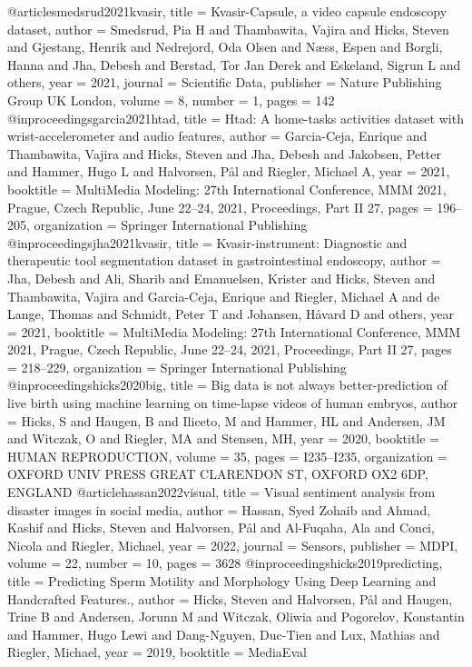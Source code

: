 @article{smedsrud2021kvasir,
	title = {Kvasir-Capsule, a video capsule endoscopy dataset},
	author = {Smedsrud, Pia H and Thambawita, Vajira and Hicks, Steven and Gjestang, Henrik and Nedrejord, Oda Olsen and N{\ae}ss, Espen and Borgli, Hanna and Jha, Debesh and Berstad, Tor Jan Derek and Eskeland, Sigrun L and others},
	year = 2021,
	journal = {Scientific Data},
	publisher = {Nature Publishing Group UK London},
	volume = 8,
	number = 1,
	pages = 142
}
@inproceedings{garcia2021htad,
	title = {Htad: A home-tasks activities dataset with wrist-accelerometer and audio features},
	author = {Garcia-Ceja, Enrique and Thambawita, Vajira and Hicks, Steven and Jha, Debesh and Jakobsen, Petter and Hammer, Hugo L and Halvorsen, P{\aa}l and Riegler, Michael A},
	year = 2021,
	booktitle = {MultiMedia Modeling: 27th International Conference, MMM 2021, Prague, Czech Republic, June 22--24, 2021, Proceedings, Part II 27},
	pages = {196--205},
	organization = {Springer International Publishing}
}
@inproceedings{jha2021kvasir,
	title = {Kvasir-instrument: Diagnostic and therapeutic tool segmentation dataset in gastrointestinal endoscopy},
	author = {Jha, Debesh and Ali, Sharib and Emanuelsen, Krister and Hicks, Steven and Thambawita, Vajira and Garcia-Ceja, Enrique and Riegler, Michael A and de Lange, Thomas and Schmidt, Peter T and Johansen, H{\aa}vard D and others},
	year = 2021,
	booktitle = {MultiMedia Modeling: 27th International Conference, MMM 2021, Prague, Czech Republic, June 22--24, 2021, Proceedings, Part II 27},
	pages = {218--229},
	organization = {Springer International Publishing}
}
@inproceedings{hicks2020big,
	title = {Big data is not always better-prediction of live birth using machine learning on time-lapse videos of human embryos},
	author = {Hicks, S and Haugen, B and Iliceto, M and Hammer, HL and Andersen, JM and Witczak, O and Riegler, MA and Stensen, MH},
	year = 2020,
	booktitle = {HUMAN REPRODUCTION},
	volume = 35,
	pages = {I235--I235},
	organization = {OXFORD UNIV PRESS GREAT CLARENDON ST, OXFORD OX2 6DP, ENGLAND}
}
@article{hassan2022visual,
	title = {Visual sentiment analysis from disaster images in social media},
	author = {Hassan, Syed Zohaib and Ahmad, Kashif and Hicks, Steven and Halvorsen, P{\aa}l and Al-Fuqaha, Ala and Conci, Nicola and Riegler, Michael},
	year = 2022,
	journal = {Sensors},
	publisher = {MDPI},
	volume = 22,
	number = 10,
	pages = 3628
}
@inproceedings{hicks2019predicting,
	title = {Predicting Sperm Motility and Morphology Using Deep Learning and Handcrafted Features.},
	author = {Hicks, Steven and Halvorsen, P{\aa}l and Haugen, Trine B and Andersen, Jorunn M and Witczak, Oliwia and Pogorelov, Konstantin and Hammer, Hugo Lewi and Dang-Nguyen, Duc-Tien and Lux, Mathias and Riegler, Michael},
	year = 2019,
	booktitle = {MediaEval}
}

